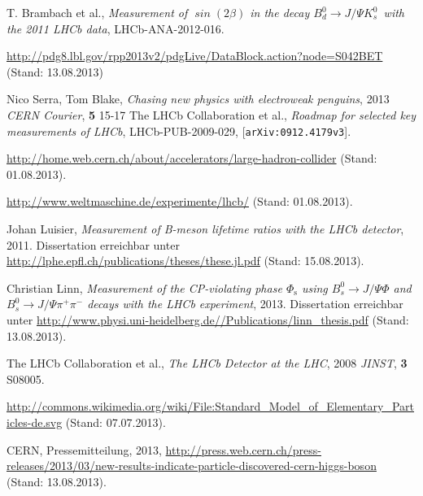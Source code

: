\documentclass[ a4paper,
                12pt, 
                twoside, 
                chapterprefix,
                BCOR=17mm,
                bibtotoc,
              ]{scrreprt}
\newcommand{\Decaychannel}{$B_d^0 \rightarrow J/\Psi K_s^0$}
\begin{document}

\pagestyle{headings}

\tableofcontents









\begin{thebibliography}{---}
 T. Brambach et al., \textit{Measurement of $\mathit{\sin(2\beta)}$ in the decay \Decaychannel\ with the 2011 LHCb data}, LHCb-ANA-2012-016.

 \url{http://pdg8.lbl.gov/rpp2013v2/pdgLive/DataBlock.action?node=S042BET} (Stand: 13.08.2013)

 Nico Serra, Tom Blake, \textit{Chasing new physics with electroweak penguins}, 2013 \textit{CERN Courier}, \textbf{5} 15-17 
 The LHCb Collaboration et al., \textit{Roadmap for selected key measurements of LHCb}, LHCb-PUB-2009-029, [\texttt{arXiv:0912.4179v3}]. 

 \url{http://home.web.cern.ch/about/accelerators/large-hadron-collider} (Stand: 01.08.2013).

 \url{http://www.weltmaschine.de/experimente/lhcb/} (Stand: 01.08.2013).

 Johan Luisier, \textit{Measurement of B-meson lifetime ratios with the LHCb detector}, 2011. Dissertation erreichbar unter \url{http://lphe.epfl.ch/publications/theses/these.jl.pdf} (Stand: 15.08.2013).

 Christian Linn, \textit{Measurement of the CP-violating phase $\Phi_{\text{s}}$ using $B_s^0 \rightarrow J/\Psi\Phi$ and $B_s^0 \rightarrow J/\Psi\pi^+\pi^-$ decays with the LHCb experiment}, 2013. Dissertation erreichbar unter \url{http://www.physi.uni-heidelberg.de//Publications/linn_thesis.pdf} (Stand: 13.08.2013).

 The LHCb Collaboration et al., \textit{The LHCb Detector at the LHC}, 2008 \textit{JINST}, \textbf{3} S08005.

 \url{http://commons.wikimedia.org/wiki/File:Standard_Model_of_Elementary_Particles-de.svg} (Stand: 07.07.2013).

 CERN, Pressemitteilung, 2013, \url{http://press.web.cern.ch/press-releases/2013/03/new-results-indicate-particle-discovered-cern-higgs-boson} (Stand: 13.08.2013).


\end{thebibliography}
\end{document}
